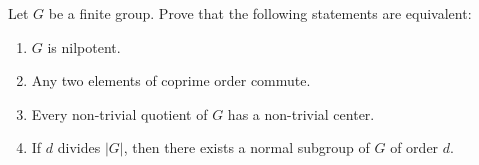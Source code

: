 
\begin{exercise}
\label{xca:nilpotent_equivalencia}
Let $G$ be a finite group. Prove that the following statements are equivalent:
\begin{enumerate}
	\item $G$ is nilpotent.
	\item Any two elements of coprime order commute. 
 	\item Every non-trivial quotient of $G$ has a non-trivial center.
	\item If $d$ divides $|G|$, then there exists a normal subgroup of $G$ of order $d$. 
 \end{enumerate}
\end{exercise}



